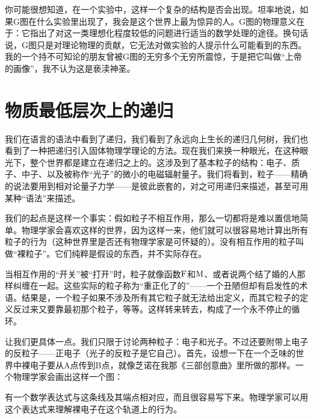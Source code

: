 你可能很想知道，在一个实验中，这样一个复杂的结构是否会出现。坦率地说，如果G图在什么实验里出现了，我会是这个世界上最为惊异的人。G图的物理意义在于：它指出了对这一类理想化程度较低的问题进行适当的数学处理的途径。换句话说，G图只是对理论物理的贡献，它无法对做实验的人提示什么可能看到的东西。我的一个持不可知论的朋友曾被G图的无穷多个无穷所震惊，于是把它叫做“上帝的画像”，我不认为这是亵渎神圣。

\section{物质最低层次上的递归}

我们在语言的语法中看到了递归，我们看到了永远向上生长的递归几何树，我们也看到了一种把递归引入固体物理学理论的方法。现在我们来换一种眼光，在这种眼光下，整个世界都是建立在递归之上的。这涉及到了基本粒子的结构：电子、质子、中子、以及被称作“光子”的微小的电磁辐射量子。我们将看到，粒子——精确的说法要用到相对论量子力学——是彼此嵌套的，对之可用递归来描述，甚至可用某种“语法”来描述。

我们的起点是这样一个事实：假如粒子不相互作用，那么一切都将是难以置信地简单。物理学家会喜欢这样的世界，因为这样一来，他们就可以很容易地计算出所有粒子的行为（这种世界里是否还有物理学家是可怀疑的）。没有相互作用的粒子叫做“裸粒子”。它们纯粹是假设的东西，并不实际存在。

当相互作用的“开关”被“打开”时，粒子就像函数$\operatorname{F}$和$\operatorname{M}$、或者说两个结了婚的人那样纠缠在一起。这些实际的粒子称为“重正化了的”——一个丑陋但却有启发性的术语。结果是，一个粒子如果不涉及所有其它粒子就无法给出定义，而其它粒子的定义反过来又要靠最初那个粒子，等等。这样转来转去，构成了一个永不停止的循环。

让我们更具体一点。我们只限于讨论两种粒子：电子和光子。不过还要附带上电子的反粒子——正电子（光子的反粒子是它自己）。首先，设想一下在一个乏味的世界中裸电子要从A点传到B点，就像芝诺在我那《三部创意曲》里所做的那样。一个物理学家会画出这样一个图：
\begin{center}
\end{center}

有一个数学表达式与这条线及其端点相对应，而且很容易写下来。物理学家可以用这个表达式来理解裸电子在这个轨道上的行为。

